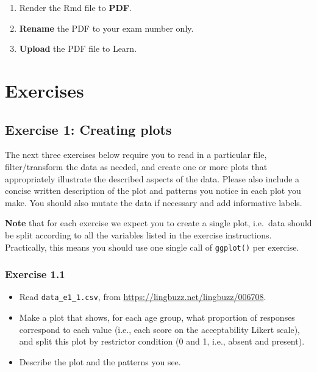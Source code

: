 \documentclass[
]{article}
\providecommand{\tightlist}{%
  \setlength{\itemsep}{0pt}\setlength{\parskip}{0pt}}
\begin{document}
\begin{enumerate}
\def\labelenumi{\arabic{enumi}.}
\tightlist
\item
  Render the Rmd file to \textbf{PDF}.
\item
  \textbf{Rename} the PDF to your exam number only.
\item
  \textbf{Upload} the PDF file to Learn.
\end{enumerate}

\newpage

\section{Exercises}\label{exercises}

\subsection{Exercise 1: Creating plots}\label{exercise-1-creating-plots}

The next three exercises below require you to read in a particular file,
filter/transform the data as needed, and create one or more plots that
appropriately illustrate the described aspects of the data. Please also
include a concise written description of the plot and patterns you
notice in each plot you make. You should also mutate the data if
necessary and add informative labels.

\textbf{Note} that for each exercise we expect you to create a single
plot, i.e.~data should be split according to all the variables listed in
the exercise instructions. Practically, this means you should use one
single call of \texttt{ggplot()} per exercise.

\subsubsection{Exercise 1.1}\label{exercise-1.1}

\begin{itemize}
\tightlist
\item
  Read \texttt{data\_e1\_1.csv}, from
  \url{https://lingbuzz.net/lingbuzz/006708}.
\item
  Make a plot that shows, for each age group, what proportion of
  responses correspond to each value (i.e., each score on the
  acceptability Likert scale), and split this plot by restrictor
  condition (0 and 1, i.e., absent and present).
\item
  Describe the plot and the patterns you see.
\end{itemize}
\end{document}
